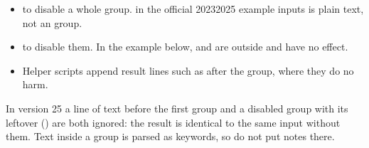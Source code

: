 \documentclass[letterpaper,10pt,english,openany,oneside]{sphinxmanual}
\begin{document}
\begin{itemize}
\item {} 
\sphinxAtStartPar
{} to disable a whole group.  in the official 2023\textendash{}2025 example inputs is plain text,
not an  group.

\item {} 
\sphinxAtStartPar
{} to disable them. In the example below,  and  are outside  and
have no effect.

\item {} 
\sphinxAtStartPar
{} Helper scripts append result lines such as  after the  group,
where they do no harm.

\end{itemize}

\begin{sphinxVerbatim}[commandchars=\\\{\}]
\end{sphinxVerbatim}



\sphinxAtStartPar
In version 25 a line of text before the first group and a disabled group with its leftover 
() are both ignored: the result is identical to the same input without them. Text inside a
group is parsed as keywords, so do not put notes there.
\end{document}
